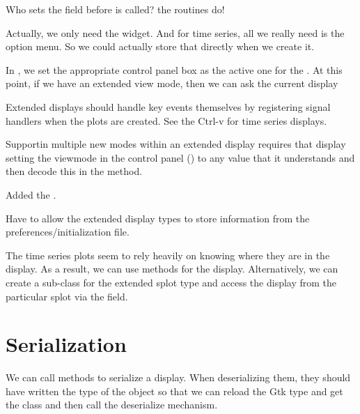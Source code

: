 \documentclass{article}
\begin{document}
Who sets the  field before
 is called?  the 
routines do!


Actually, we only need the widget.  And for time series, all we really
need is the option menu.  So we could actually store that directly
when we create it.

In , we set the appropriate control panel box
as the active one for the .  At this point, if
we have an extended view mode, then we can ask the current display


Extended displays should handle key events themselves by registering
signal handlers when the plots are created.  See the Ctrl-v for time
series displays.

Supportin multiple new modes within an extended display requires that
display setting the viewmode in the control panel
() to any value that it understands and then
decode this in the  method.

Added the .



Have to allow the extended display types to store information from
the preferences/initialization file.


The time series plots seem to rely heavily on knowing where they are
in the display.  As a result, we can use methods for the display.
Alternatively, we can create a sub-class for the extended splot type
and access the display from the particular splot via the
 field.






\section{Serialization}

We can call methods to serialize a display.  When deserializing them,
they should have written the type of the object so that we can reload
the Gtk type and get the class and then call the deserialize
mechanism.
\end{document}
